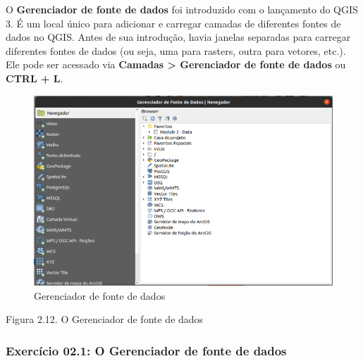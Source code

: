 \documentclass[
  portuguese,
]{krantz}
\begin{document}
O \textbf{Gerenciador de fonte de dados} foi introduzido com o lançamento do QGIS 3. É um local único para adicionar e carregar camadas de diferentes fontes de dados no QGIS. Antes de sua introdução, havia janelas separadas para carregar diferentes fontes de dados (ou seja, uma para rasters, outra para vetores, etc.). Ele pode ser acessado via \textbf{Camadas \textgreater{} Gerenciador de fonte de dados} ou \textbf{CTRL + L}.

\begin{figure}
\centering
\includegraphics{media/modulo2/data-source-manager-1.png}
\caption{Gerenciador de fonte de dados}
\end{figure}

Figura 2.12. O Gerenciador de fonte de dados

\hypertarget{exercuxedcio-02.1-o-gerenciador-de-fonte-de-dados}{%
\subsubsection{\texorpdfstring{\textbf{Exercício 02.1: O Gerenciador de fonte de dados}}{Exercício 02.1: O Gerenciador de fonte de dados}}\label{exercuxedcio-02.1-o-gerenciador-de-fonte-de-dados}}
\end{document}
